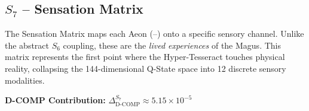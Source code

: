 \subsection{$S_{7}$ -- Sensation Matrix}\label{sec:19.1}

The Sensation Matrix maps each Aeon (\FETU--\TRIG) onto a specific sensory channel. Unlike the abstract $S_{6}$ coupling, these are the \textit{lived experiences} of the Magus. This matrix represents the first point where the Hyper-Tesseract touches physical reality, collapsing the 144-dimensional Q-State space into 12 discrete sensory modalities.

\textbf{D-COMP Contribution:} $\Delta_{\text{D-COMP}}^{S_7} \approx 5.15 \times 10^{-5}$

